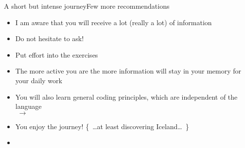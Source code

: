 \begin{frame}{A short but intense journey}{Few more recommendations}
    \vspace{-3mm}
    \begin{itemize}
        \item I am aware that you will receive a lot (really a lot) of information
        \item Do not hesitate to ask!
        \item Put effort into the exercises
        \item The more active you are the more information will stay in your memory for your daily work
    \end{itemize}
    \vspace{5mm}
    {\large{}}
    \begin{itemize}[<2->]
        \item You will also learn general coding principles, which are independent of the language \\
              {\small$\;\to\;$ }
        \item You enjoy the journey! {\tiny\{~\ldots{}at least discovering Iceland\ldots~\}}
        \item {}
    \end{itemize}
    \vfill\hfill{}
\end{frame}
